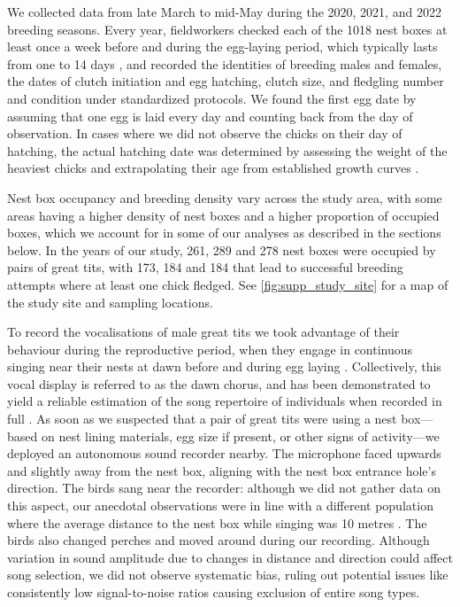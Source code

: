 \documentclass[9pt, onecolumn, twoside, lineno]{gsajnl}
\begin{document}
We collected data from late March to mid-May during the 2020, 2021, and 2022 breeding seasons. Every year, fieldworkers checked each of the 1018 nest boxes at least once a week before and during the egg-laying period, which typically lasts from one to 14 days \autocite{Perrins1965}, and recorded the identities of breeding males and females, the dates of clutch initiation and egg hatching, clutch size, and fledgling number and condition under standardized protocols. We found the first egg date by assuming that one egg is laid every day and counting back from the day of observation. In cases where we did not observe the chicks on their day of hatching, the actual hatching date was determined by assessing the weight of the heaviest chicks and extrapolating their age from established growth curves \autocite{cresswell2003, gibb1950}.

Nest box occupancy and breeding density vary across the study area, with some areas having a higher density of nest boxes and a higher proportion of occupied boxes, which we account for in some of our analyses as described in the sections below. In the years of our study,  261, 289 and 278 nest boxes were occupied by pairs of great tits, with 173, 184 and 184 that lead to successful breeding attempts where at least one chick fledged. See \autoref{fig:supp_study_site} for a map of the study site and sampling locations.

To record the vocalisations of male great tits we took advantage of their behaviour during the reproductive period, when they engage in continuous singing near their nests at dawn before and during egg laying \autocite{mace1987}. Collectively, this vocal display is referred to as the dawn chorus, and has been demonstrated to yield a reliable estimation of the song repertoire of individuals when recorded in full \autocite{rivera-gutierrez2012, vanduyse2005}. As soon as we suspected that a pair of great tits were using a nest box---based on nest lining materials, egg size if present, or other signs of activity---we deployed an autonomous sound recorder nearby. The microphone faced upwards and slightly away from the nest box, aligning with the nest box entrance hole's direction. The birds sang near the recorder: although we did not gather data on this aspect, our anecdotal observations were in line with a different population where the average distance to the nest box while singing was 10 metres \autocite{halfwerk2012}. The birds also changed perches and moved around during our recording. Although variation in sound amplitude due to changes in distance and direction could affect song selection, we did not observe systematic bias, ruling out potential issues like consistently low signal-to-noise ratios causing exclusion of entire song types.
\end{document}
